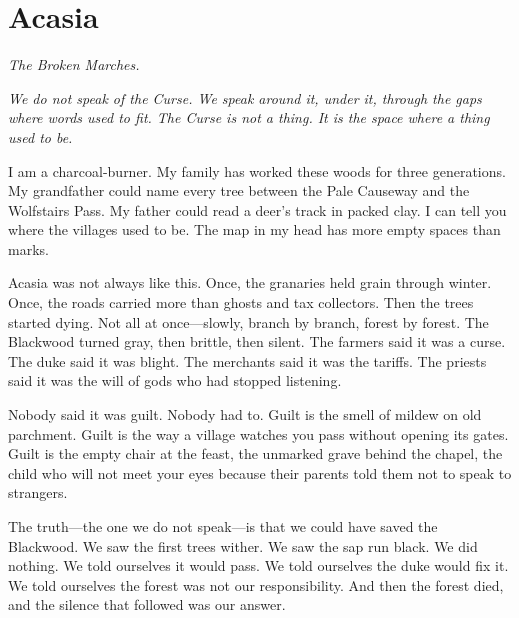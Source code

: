 \newpage

\newpage

\chapter{Acasia}
\emph{The Broken Marches.}

\noindent
{\Large
\textit{We do not speak of the Curse. We speak around it, under it, through the gaps where words used to fit. The Curse is not a thing. It is the space where a thing used to be.}

\vspace{0.5em}

I am a charcoal-burner. My family has worked these woods for three generations. My grandfather could name every tree between the Pale Causeway and the Wolfstairs Pass. My father could read a deer's track in packed clay. I can tell you where the villages used to be. The map in my head has more empty spaces than marks.

\vspace{0.5em}

Acasia was not always like this. Once, the granaries held grain through winter. Once, the roads carried more than ghosts and tax collectors. Then the trees started dying. Not all at once---slowly, branch by branch, forest by forest. The Blackwood turned gray, then brittle, then silent. The farmers said it was a curse. The duke said it was blight. The merchants said it was the tariffs. The priests said it was the will of gods who had stopped listening.

\vspace{0.5em}

Nobody said it was guilt. Nobody had to. Guilt is the smell of mildew on old parchment. Guilt is the way a village watches you pass without opening its gates. Guilt is the empty chair at the feast, the unmarked grave behind the chapel, the child who will not meet your eyes because their parents told them not to speak to strangers.

\vspace{0.5em}

The truth---the one we do not speak---is that we could have saved the Blackwood. We saw the first trees wither. We saw the sap run black. We did nothing. We told ourselves it would pass. We told ourselves the duke would fix it. We told ourselves the forest was not our responsibility. And then the forest died, and the silence that followed was our answer.

}
